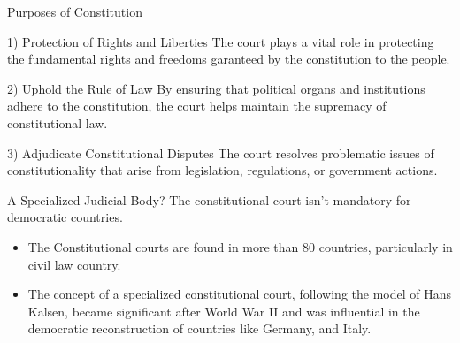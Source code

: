 \documentclass[aspectratio=169]{beamer}
\begin{document}
\begin{frame}{Purposes of Constitution}
	\begin{block}{1) Protection of Rights and Liberties}
		The court plays a vital role in protecting the fundamental rights and freedoms
garanteed by the constitution to the people.
	\end{block}
	\begin{block}{2) Uphold the Rule of Law}
	By ensuring that political organs and institutions adhere to the constitution, the court
helps maintain the supremacy of constitutional law.
	\end{block}
	\begin{block}{3) Adjudicate Constitutional Disputes}
	The court resolves problematic issues of constitutionality that arise from legislation,
regulations, or government actions.
	\end{block}	
\end{frame}



\begin{frame}{A Specialized Judicial Body?}
The constitutional court isn’t mandatory for democratic countries.
		\begin{itemize}
			\item The Constitutional courts are found in more than 80 countries, particularly in civil law
country.
			\item The concept of a specialized constitutional court, following the model of Hans
Kalsen, became significant after World War II and was influential in the democratic
reconstruction of countries like Germany, and Italy.
		\end{itemize}
\end{frame}
\end{document}
